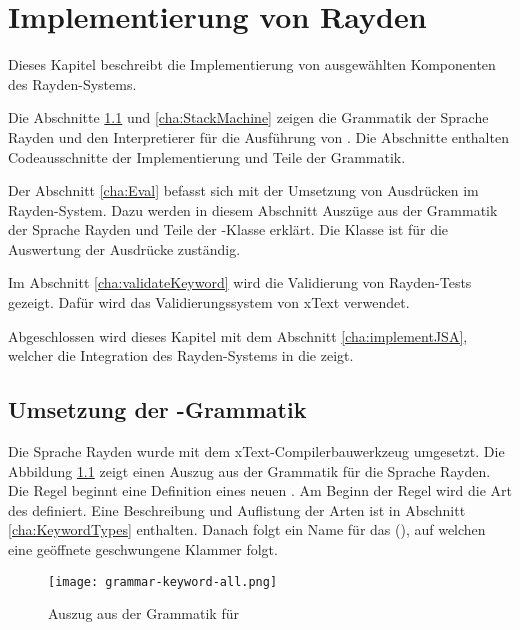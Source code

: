 \chapter{Implementierung von Rayden}
\label{cha:Implementierung}

Dieses Kapitel beschreibt die Implementierung von ausgewählten Komponenten des Rayden-Systems. 

\SuperPar
Die Abschnitte \ref{cha:KeywordGrammar} und \ref{cha:StackMachine} zeigen die Grammatik der Sprache Rayden und den Interpretierer für die Ausführung von . Die Abschnitte enthalten Codeausschnitte der Implementierung und Teile der Grammatik.

\SuperPar
Der Abschnitt \ref{cha:Eval} befasst sich mit der Umsetzung von Ausdrücken im Rayden-System. Dazu werden in diesem Abschnitt Auszüge aus der Grammatik der Sprache Rayden und Teile der -Klasse erklärt. Die Klasse  ist für die Auswertung der Ausdrücke zuständig. 

\SuperPar
Im Abschnitt \ref{cha:validateKeyword} wird die Validierung von Rayden-Tests gezeigt. Dafür wird das Validierungssystem von xText verwendet. 

\SuperPar
Abgeschlossen wird dieses Kapitel mit dem Abschnitt \ref{cha:implementJSA}, welcher die Integration des Rayden-Systems in die  zeigt. 


\section{Umsetzung der -Grammatik}
\label{cha:KeywordGrammar}

Die Sprache Rayden wurde mit dem xText-Compilerbauwerkzeug umgesetzt. Die Abbildung \ref{fig:keywordGrammar} zeigt einen Auszug aus der Grammatik für die Sprache Rayden. Die Regel  beginnt eine Definition eines neuen . Am Beginn der Regel wird die Art des  definiert. Eine Beschreibung und Auflistung der Arten ist in Abschnitt \ref{cha:KeywordTypes} enthalten. Danach folgt ein Name für das  (), auf welchen eine geöffnete geschwungene Klammer folgt.

\begin{figure}
\centering
\texttt{[image: grammar-keyword-all.png]}
\caption{Auszug aus der Grammatik für }
\label{fig:keywordGrammar}
\end{figure}

